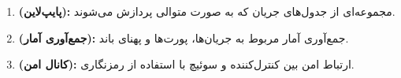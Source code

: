 \begin{qsolve}
\begin{enumerate}
	 	\item \textbf{ (پایپ‌لاین):} 
	 	مجموعه‌ای از جدول‌های جریان که به صورت متوالی پردازش می‌شوند.
	 	
	 	\item \textbf{ (جمع‌آوری آمار):} 
	 	جمع‌آوری آمار مربوط به جریان‌ها، پورت‌ها و پهنای باند.
	 	
	 	\item \textbf{ (کانال امن):} 
	 	ارتباط امن بین کنترل‌کننده و سوئیچ با استفاده از رمزنگاری.
	 \end{enumerate}
\end{qsolve}